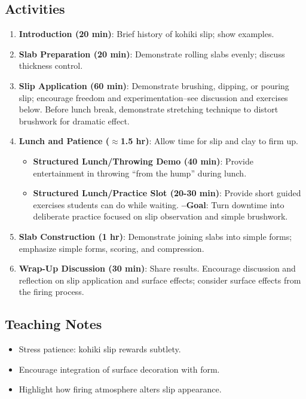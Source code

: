 \documentclass[12pt]{scrartcl}
\begin{document}
\subsection*{Activities}
\begin{enumerate}
  \item \textbf{Introduction (20 min)}: Brief history of kohiki slip; show examples.
  \item \textbf{Slab Preparation (20 min)}: Demonstrate rolling slabs evenly; discuss thickness control.
  \item \textbf{Slip Application (60 min)}: Demonstrate brushing, dipping, or pouring slip; encourage freedom and experimentation--see discussion and exercises below.  Before lunch break, demonstrate stretching technique to distort brushwork for dramatic effect.
  \item \textbf{Lunch and Patience ($\approx$1.5 hr)}: Allow time for slip and clay to firm up.
  \begin{itemize}
    \item \textbf{Structured Lunch/Throwing Demo (40 min)}: Provide entertainment in throwing ``from the hump'' during lunch.
    \item \textbf{Structured Lunch/Practice Slot (20-30 min)}: Provide short guided exercises students can do while waiting.
    \subitem \textbf{--Goal}: Turn downtime into deliberate practice focused on slip observation and simple brushwork.
  \end{itemize}
  \item \textbf{Slab Construction (1 hr)}: Demonstrate joining slabs into simple forms; emphasize simple forms, scoring, and compression.
  \item \textbf{Wrap-Up Discussion (30 min)}: Share results.  Encourage discussion and reflection on slip application and surface effects; consider surface effects from the firing process.
\end{enumerate}

\subsection*{Teaching Notes}
\begin{itemize}
  \item Stress patience: kohiki slip rewards subtlety.
  \item Encourage integration of surface decoration with form.
  \item Highlight how firing atmosphere alters slip appearance.
\end{itemize}
\thispagestyle{noPrint}
\end{document}
